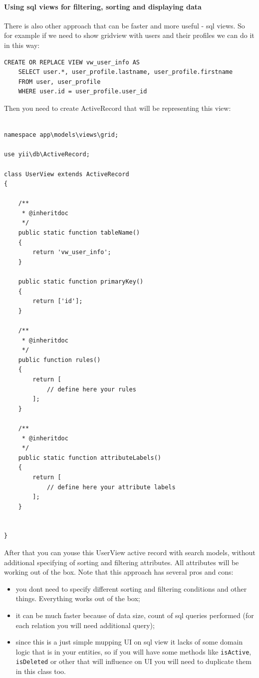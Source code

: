 \paragraph{Using sql views for filtering, sorting and displaying data}
There is also other approach that can be faster and more useful - sql views. So for example if we need to show gridview 
with users and their profiles we can do it in this way:

\lstset{language=php}\begin{lstlisting}
CREATE OR REPLACE VIEW vw_user_info AS
    SELECT user.*, user_profile.lastname, user_profile.firstname
    FROM user, user_profile
    WHERE user.id = user_profile.user_id
\end{lstlisting}
Then you need to create ActiveRecord that will be representing this view:

\lstset{language=php}\begin{lstlisting}

namespace app\models\views\grid;

use yii\db\ActiveRecord;

class UserView extends ActiveRecord
{

    /**
     * @inheritdoc
     */
    public static function tableName()
    {
        return 'vw_user_info';
    }

    public static function primaryKey()
    {
        return ['id'];
    }

    /**
     * @inheritdoc
     */
    public function rules()
    {
        return [
            // define here your rules
        ];
    }

    /**
     * @inheritdoc
     */
    public static function attributeLabels()
    {
        return [
            // define here your attribute labels
        ];
    }


}
\end{lstlisting}
After that you can youse this UserView active record with search models, without additional specifying of sorting and filtering attributes.
All attributes will be working out of the box. Note that this approach has several pros and cons:

\begin{itemize}
\item you dont need to specify different sorting and filtering conditions and other things. Everything works out of the box;
\item it can be much faster because of data size, count of sql queries performed (for each relation you will need additional query);
\item since this is a just simple mupping UI on sql view it lacks of some domain logic that is in your entities, so if you will have some methods like \lstinline|isActive|,
\lstinline|isDeleted| or other that will influence on UI you will need to duplicate them in this class too.
\end{itemize}
